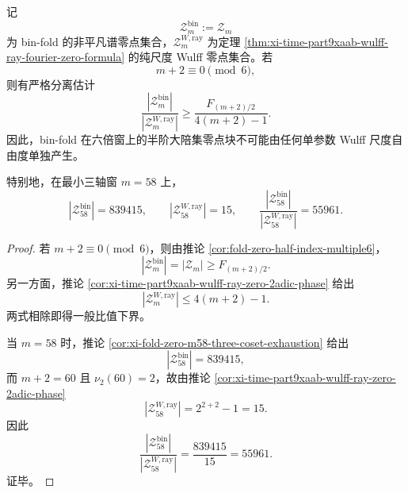 \begin{theorem}[六倍窗上半阶零点块与纯尺度零集的严格分离]\label{thm:xi-time-part9xaab-wulff-ray-zero-block-separation}
记
\[
\mathcal Z_m^{\mathrm{bin}}:=\mathcal Z_m
\]
为 bin-fold 的非平凡谱零点集合，\(\mathcal Z_m^{W,\mathrm{ray}}\) 为定理 \ref{thm:xi-time-part9xaab-wulff-ray-fourier-zero-formula} 的纯尺度 Wulff 零点集合。若
\[
m+2\equiv 0\pmod 6,
\]
则有严格分离估计
\[
\frac{|\mathcal Z_m^{\mathrm{bin}}|}{|\mathcal Z_m^{W,\mathrm{ray}}|}
\ge
\frac{F_{(m+2)/2}}{4(m+2)-1}.
\]
因此，bin-fold 在六倍窗上的半阶大陪集零点块不可能由任何单参数 Wulff 尺度自由度单独产生。

特别地，在最小三轴窗 \(m=58\) 上，
\[
|\mathcal Z_{58}^{\mathrm{bin}}|=839415,
\qquad
|\mathcal Z_{58}^{W,\mathrm{ray}}|=15,
\qquad
\frac{|\mathcal Z_{58}^{\mathrm{bin}}|}{|\mathcal Z_{58}^{W,\mathrm{ray}}|}=55961.
\]
\end{theorem}
\begin{proof}
若 \(m+2\equiv 0\pmod 6\)，则由推论 \ref{cor:fold-zero-half-index-multiple6}，
\[
|\mathcal Z_m^{\mathrm{bin}}|
=
|\mathcal Z_m|
\ge
F_{(m+2)/2}.
\]
另一方面，推论 \ref{cor:xi-time-part9xaab-wulff-ray-zero-2adic-phase} 给出
\[
|\mathcal Z_m^{W,\mathrm{ray}}|
\le
4(m+2)-1.
\]
两式相除即得一般比值下界。

当 \(m=58\) 时，推论 \ref{cor:xi-fold-zero-m58-three-coset-exhaustion} 给出
\[
|\mathcal Z_{58}^{\mathrm{bin}}|=839415,
\]
而 \(m+2=60\) 且 \(\nu_2(60)=2\)，故由推论 \ref{cor:xi-time-part9xaab-wulff-ray-zero-2adic-phase}
\[
|\mathcal Z_{58}^{W,\mathrm{ray}}|
=
2^{2+2}-1
=15.
\]
因此
\[
\frac{|\mathcal Z_{58}^{\mathrm{bin}}|}{|\mathcal Z_{58}^{W,\mathrm{ray}}|}
=
\frac{839415}{15}
=55961.
\]
证毕。
\end{proof}


